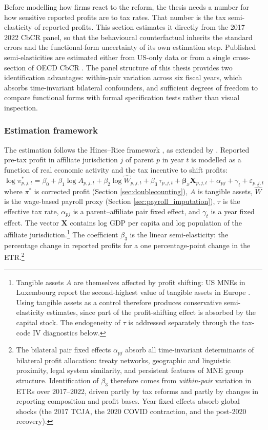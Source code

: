 \documentclass[11pt,a4paper]{article}
\begin{document}
Before modelling how firms react to the reform, the thesis needs a number for how sensitive reported profits are to tax rates. That number is the tax semi-elasticity of reported profits. This section estimates it directly from the 2017--2022 CbCR panel, so that the behavioural counterfactual inherits the standard errors and the functional-form uncertainty of its own estimation step. Published semi-elasticities are estimated either from US-only data \citep{dowd2017} or from a single cross-section of OECD CbCR \citep{garcia-bernardo2024}. The panel structure of this thesis provides two identification advantages: within-pair variation across six fiscal years, which absorbs time-invariant bilateral confounders, and sufficient degrees of freedom to compare functional forms with formal specification tests rather than visual inspection.

\subsubsection{Estimation framework}\label{sec:hines_rice}

The estimation follows the Hines--Rice framework \citep{hines1994}, as extended by \citet{garcia-bernardo2024}. Reported pre-tax profit in affiliate jurisdiction $j$ of parent $p$ in year $t$ is modelled as a function of real economic activity and the tax incentive to shift profits:
\begin{equation}\label{eq:panel_linear}
\log \pi_{p,j,t}^{*} = \beta_0 + \beta_1 \log A_{p,j,t} + \beta_2 \log \hat{W}_{p,j,t} + \beta_3 \, \tau_{p,j,t} + \mathbf{\beta}_x \mathbf{X}_{p,j,t} + \alpha_{pj} + \gamma_t + \varepsilon_{p,j,t}
\end{equation}
where $\pi^{*}$ is corrected profit (Section \ref{sec:doublecounting}), $A$ is tangible assets, $\hat{W}$ is the wage-based payroll proxy (Section \ref{sec:payroll_imputation}), $\tau$ is the effective tax rate, $\alpha_{pj}$ is a parent--affiliate pair fixed effect, and $\gamma_t$ is a year fixed effect. The vector $\mathbf{X}$ contains log GDP per capita and log population of the affiliate jurisdiction.\footnote{Tangible assets $A$ are themselves affected by profit shifting: US MNEs in Luxembourg report the second-highest value of tangible assets in Europe \citep{garcia-bernardo2024}. Using tangible assets as a control therefore produces conservative semi-elasticity estimates, since part of the profit-shifting effect is absorbed by the capital stock. The endogeneity of $\tau$ is addressed separately through the tax-code IV diagnostics below.} The coefficient $\beta_3$ is the linear semi-elasticity: the percentage change in reported profits for a one percentage-point change in the ETR.\footnote{The bilateral pair fixed effects $\alpha_{pj}$ absorb all time-invariant determinants of bilateral profit allocation: treaty networks, geographic and linguistic proximity, legal system similarity, and persistent features of MNE group structure. Identification of $\beta_3$ therefore comes from \emph{within-pair} variation in ETRs over 2017--2022, driven partly by tax reforms and partly by changes in reporting composition and profit bases. Year fixed effects absorb global shocks (the 2017 TCJA, the 2020 COVID contraction, and the post-2020 recovery).}
\end{document}

